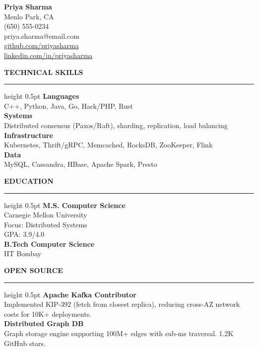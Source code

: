 \documentclass[10pt,letterpaper]{article}
\newcommand{\sidesection}[1]{{\color{accent}\bfseries\uppercase{\small #1}}\\\vspace{2pt}\color{white}\hrule height 0.5pt\vspace{4pt}}
\begin{document}
\noindent
\begin{minipage}[t]{0.32\textwidth}
\colorbox{sidebar}{\parbox[t][\paperheight][t]{\dimexpr\textwidth-12pt}{%
\vspace{12pt}\color{white}\centering
{\Large\bfseries Priya Sharma}\\[4pt]
{\footnotesize Menlo Park, CA}\\
{\footnotesize (650) 555-0234}\\
{\footnotesize priya.sharma@email.com}\\[3pt]
{\footnotesize\href{https://github.com/priyasharma}{\color{accent}github.com/priyasharma}}\\
{\footnotesize\href{https://linkedin.com/in/priyasharma}{\color{accent}linkedin.com/in/priyasharma}}\\[12pt]
\raggedright\hspace{6pt}\begin{minipage}{\dimexpr\textwidth-12pt}
\sidesection{Technical Skills}
{\footnotesize
\textbf{Languages}\\
C++, Python, Java, Go, Hack/PHP, Rust\\[4pt]
\textbf{Systems}\\
Distributed consensus (Paxos/Raft), sharding, replication, load balancing\\[4pt]
\textbf{Infrastructure}\\
Kubernetes, Thrift/gRPC, Memcached, RocksDB, ZooKeeper, Flink\\[4pt]
\textbf{Data}\\
MySQL, Cassandra, HBase, Apache Spark, Presto\\[10pt]
}

\sidesection{Education}
{\footnotesize
\textbf{M.S. Computer Science}\\
Carnegie Mellon University\\
Focus: Distributed Systems\\
GPA: 3.9/4.0 \\[6pt]
\textbf{B.Tech Computer Science}\\
IIT Bombay \\[10pt]
}

\sidesection{Open Source}
{\footnotesize
\textbf{Apache Kafka Contributor}\\
Implemented KIP-392 (fetch from closest replica), reducing cross-AZ network costs for 10K+ deployments.\\[6pt]
\textbf{Distributed Graph DB}\\
Graph storage engine supporting 100M+ edges with sub-ms traversal. 1.2K GitHub stars.\\
}
\end{minipage}
}}
\end{minipage}%
\end{document}

